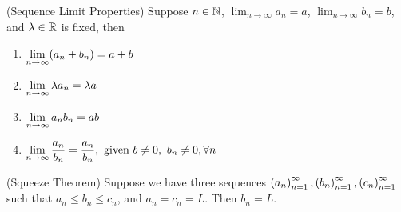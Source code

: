 \documentclass[a4paper,12pt]{report}
\begin{document}
\newpage
{}
 (Sequence Limit Properties) Suppose $n\in\mathbb{N}$, $\lim_{n\to\infty}a_n = a$, $\lim_{n\to\infty}b_n = b$, and $\lambda\in\mathbb{R}$ is fixed, then
\begin{multicols}{2}
	\begin{enumerate}[label=(\alph*), itemsep=0pt]
		\item $\displaystyle{\lim_{n\to\infty}(a_n + b_n) = a + b}$
		\item $\displaystyle{\lim_{n\to\infty}\lambda a_n = \lambda a}$
		\item $\displaystyle{\lim_{n\to\infty}a_nb_n = ab}$
		\item $\displaystyle{\lim_{n\to\infty}\frac{a_n}{b_n} = \frac{a_n}{b_n},\ \text{given}\ b\neq0,\ b_n\neq0,\forall n}$
	\end{enumerate}	
\end{multicols}
 (Squeeze Theorem) Suppose we have three sequences $\left( a_n \right)_{n=1}^{\infty}, \left( b_n \right)_{n=1}^{\infty}, \left( c_n \right)_{n=1}^{\infty}$ such that $a_n\leq b_n\leq c_n$, and $a_n = c_n = L$. Then $b_n = L$. \\
\end{document}
